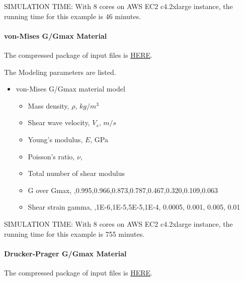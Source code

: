 SIMULATION TIME: With 8 cores on AWS EC2 c4.2xlarge instance, the running time for this example is 46 minutes.

\paragraph{von-Mises G/Gmax Material}
The compressed package of input files is  
\href{http://sokocalo.engr.ucdavis.edu/~jeremic/lecture_notes_online_material/_Chapter_Short_Course_Examples/nonlinear_analysis_steps/soil-structure/vonMisesGoverGmax/_all_files_packaged_for_vonMisesGoverGmax.tar.gz}{HERE}. 

The Modeling parameters are listed.
\begin{itemize}
  \item von-Mises G/Gmax material model 
  \begin{itemize}
    \item Mass density, $\rho$, \enspace {} $kg/m^3$
    \item Shear wave velocity, $V_s$, \enspace {} $m/s$
    \item Young's modulus, $E$, \enspace {} GPa
    \item Poisson's ratio, $\nu$, \enspace {}
    \item Total number of shear modulus \enspace {}
    \item G over Gmax, \enspace {},0.995,0.966,0.873,0.787,0.467,0.320,0.109,0.063
    \item Shear strain gamma, \enspace {},1E-6,1E-5,5E-5,1E-4, 0.0005, 0.001, 0.005, 0.01
  \end{itemize}
\end{itemize}

SIMULATION TIME: With 8 cores on AWS EC2 c4.2xlarge instance, the running time for this example is 755 minutes.

\paragraph{Drucker-Prager G/Gmax Material}
The compressed package of input files is  
\href{http://sokocalo.engr.ucdavis.edu/~jeremic/lecture_notes_online_material/_Chapter_Short_Course_Examples/nonlinear_analysis_steps/soil-structure/DruckerPragerGoverGmax/_all_files_packaged_for_DruckerPragerGoverGmax.tar.gz}{HERE}. 

